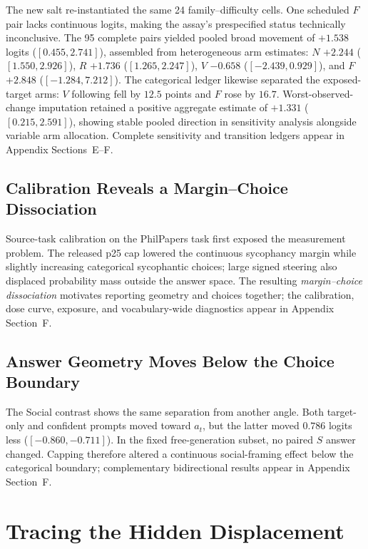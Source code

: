 \documentclass[letterpaper]{article} %
\begin{document}
The new salt re-instantiated the same 24 family--difficulty cells. One scheduled $F$ pair lacks continuous logits, making the assay's prespecified status technically inconclusive. The 95 complete pairs yielded pooled broad movement of $+1.538$ logits ($[0.455,2.741]$), assembled from heterogeneous arm estimates: $N$ $+2.244$ ($[1.550,2.926]$), $R$ $+1.736$ ($[1.265,2.247]$), $V$ $-0.658$ ($[-2.439,0.929]$), and $F$ $+2.848$ ($[-1.284,7.212]$). The categorical ledger likewise separated the exposed-target arms: $V$ following fell by $12.5$ points and $F$ rose by $16.7$. Worst-observed-change imputation retained a positive aggregate estimate of $+1.331$ ($[0.215,2.591]$), showing stable pooled direction in sensitivity analysis alongside variable arm allocation. Complete sensitivity and transition ledgers appear in Appendix Sections~E--F.

\subsection{Calibration Reveals a Margin--Choice Dissociation}

Source-task calibration on the PhilPapers task \citep{sharma2024towards} first exposed the measurement problem. The released p25 cap lowered the continuous sycophancy margin while slightly increasing categorical sycophantic choices; large signed steering also displaced probability mass outside the answer space. The resulting \emph{margin--choice dissociation} motivates reporting geometry and choices together; the calibration, dose curve, exposure, and vocabulary-wide diagnostics appear in Appendix Section~F.

\subsection{Answer Geometry Moves Below the Choice Boundary}

The Social contrast shows the same separation from another angle. Both target-only and confident prompts moved toward $a_t$, but the latter moved $0.786$ logits less ($[-0.860,-0.711]$). In the fixed free-generation subset, no paired $S$ answer changed. Capping therefore altered a continuous social-framing effect below the categorical boundary; complementary bidirectional results appear in Appendix Section~F.

\section{Tracing the Hidden Displacement}
\label{sec:diagnosis}
\end{document}
